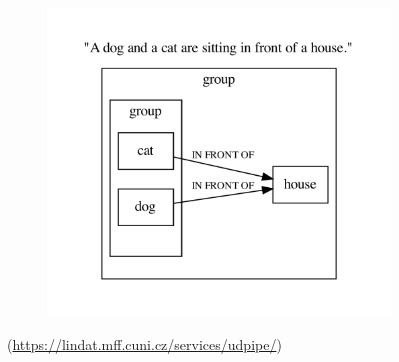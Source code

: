 \documentclass{beamer}
\begin{document}
\begin{frame}
\begin{figure}
\begin{subfigure}{0.45\textwidth}
        \end{subfigure}
        \begin{subfigure}{0.45\textwidth}
            \centering
            \includegraphics[width=\textwidth,trim=40 40 40 40,clip]{figures/scene_graph}
        \end{subfigure}
        \caption*{\color{gray}(\url{https://lindat.mff.cuni.cz/services/udpipe/})}
    \end{figure}
\end{frame}
\end{document}
